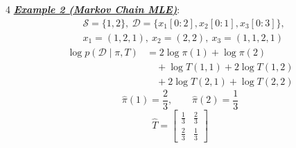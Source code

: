 \documentclass[12pt]{article}
\newcommand{\bulletPoint}[1]{\ul{\textit{\textbf{#1}}}}
\begin{document}
\begin{multicols*}{4}
\bulletPoint{Example 2 (Markov Chain MLE)}:
\useshortskip \begin{equation*}
    \begin{split}
        &\mathcal{S}=\{1,2\},\ \mathcal{D}=\{x_1[0:2],x_2[0:1],x_3[0:3]\},\\
        &x_1=(1,2,1),\ x_2=(2,2),\ x_3=(1,1,2,1)
    \end{split}
\end{equation*}
\useshortskip \begin{equation*}
    \begin{split}
        \log p(\mathcal{D}\mid\pi,T)
        &=2\log\pi(1)+\log\pi(2)\\
        &\quad+\log T(1,1)+2\log T(1,2)\\
        &\quad+2\log T(2,1)+\log T(2,2)
    \end{split}
\end{equation*}
\useshortskip \begin{equation*}
    \hat{\pi}(1)=\frac{2}{3},\qquad
    \hat{\pi}(2)=\frac{1}{3}
\end{equation*}
\useshortskip \begin{equation*}
    \hat{T}=
    \begin{bmatrix}
    \frac{1}{3} & \frac{2}{3}\\
    \frac{2}{3} & \frac{1}{3}
    \end{bmatrix}
\end{equation*}


\end{multicols*}
\end{document}
